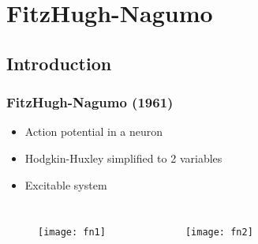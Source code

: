 \documentclass[11pt]{beamer}
\begin{document}
\begin{comment}
    \draw [-] (inverse) -- (output);
    \draw [->] (output) |- node[near start] {$u$}(linear_tf);
    \draw [-] (linear_tf) -| node[near end] {$y$} (input);
    \draw [->] (input) -- (inverse);

\end{tikzpicture}
\column{0.5\textwidth}
\begin{figure}
\texttt{[image: goodwin\_mathcing]}
\end{figure}
\end{columns}
\end{frame}

\end{comment}
\section{FitzHugh-Nagumo}

\subsection{Introduction}

\begin{frame}
\frametitle{FitzHugh-Nagumo (1961)}

\begin{itemize}
\item Action potential in a neuron
\item Hodgkin-Huxley simplified to 2 variables
\item Excitable system
\end{itemize}
\begin{columns}
\begin{figure}
\texttt{[image: fn1]}
\end{figure}
\begin{figure}
\texttt{[image: fn2]}
\end{figure}
\end{columns}
\end{frame}
\end{document}
